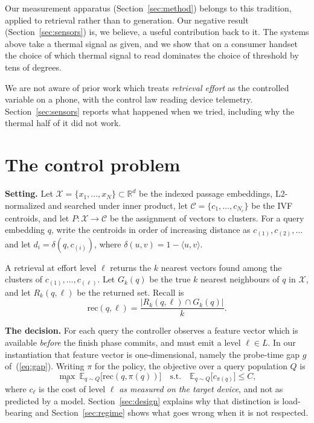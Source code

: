 \documentclass[journal]{IEEEtran}
\begin{document}
Our measurement apparatus (Section~\ref{sec:method}) belongs to this
tradition, applied to retrieval rather than to generation. Our negative
result (Section~\ref{sec:sensors}) is, we believe, a useful contribution
back to it. The systems above take a thermal signal as given, and we show
that on a consumer handset the choice of which thermal signal to read
dominates the choice of threshold by tens of degrees.

We are not aware of prior work which treats \emph{retrieval effort} as the
controlled variable on a phone, with the control law reading device
telemetry. Section~\ref{sec:sensors} reports what happened when we tried,
including why the thermal half of it did not work.

\section{The control problem}
\label{sec:problem}

\textbf{Setting.} Let $\mathcal{X} = \{x_1,\dots,x_N\} \subset
\mathbb{R}^{d}$ be the indexed passage embeddings, L2-normalized and
searched under inner product, let $\mathcal{C} = \{c_1,\dots,c_{N_c}\}$ be
the IVF centroids, and let $P : \mathcal{X} \to \mathcal{C}$ be the
assignment of vectors to clusters. For a query embedding $q$, write the
centroids in order of increasing distance as $c_{(1)}, c_{(2)}, \dots$ and
let $d_i = \delta(q, c_{(i)})$, where $\delta(u,v) = 1 - \langle u,
v\rangle$.

A retrieval at effort level $\ell$ returns the $k$ nearest vectors found
among the clusters of $c_{(1)},\dots,c_{(\ell)}$. Let $G_k(q)$ be the true
$k$ nearest neighbours of $q$ in $\mathcal{X}$, and let $R_k(q,\ell)$ be
the returned set. Recall is
\begin{equation}
\mathrm{rec}(q,\ell) = \frac{|R_k(q,\ell) \cap G_k(q)|}{k}.
\label{eq:recall}
\end{equation}

\textbf{The decision.} For each query the controller observes a feature
vector which is available \emph{before} the finish phase commits, and must
emit a level $\ell \in L$. In our instantiation that feature vector is
one-dimensional, namely the probe-time gap $g$ of~(\ref{eq:gap}). Writing
$\pi$ for the policy, the objective over a query population $Q$ is
\begin{equation}
\max_{\pi}\ \mathbb{E}_{q \sim Q}\big[\mathrm{rec}(q, \pi(q))\big]
\quad\text{s.t.}\quad
\mathbb{E}_{q \sim Q}\big[c_{\pi(q)}\big] \le C ,
\label{eq:objective}
\end{equation}
where $c_\ell$ is the cost of level $\ell$ \emph{as measured on the target
device}, and not as predicted by a model. Section~\ref{sec:design} explains
why that distinction is load-bearing and Section~\ref{sec:regime} shows
what goes wrong when it is not respected.
\end{document}
